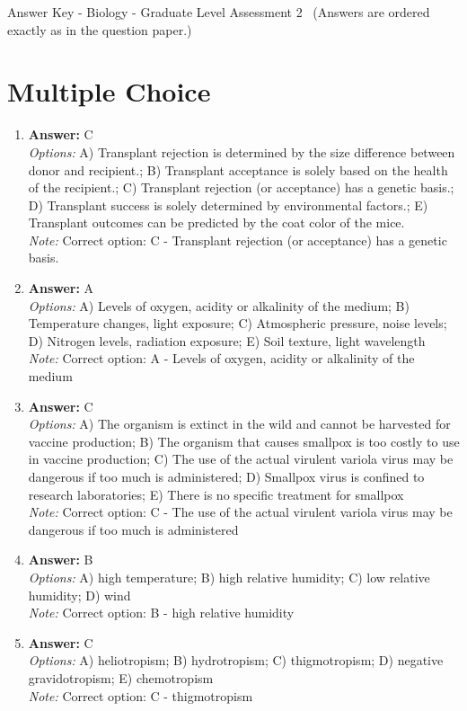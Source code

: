 \documentclass[12pt]{article}
\begin{document}
\begin{center}
Answer Key - Biology - Graduate Level Assessment 2 \
\small (Answers are ordered exactly as in the question paper.)
\end{center}

\section*{Multiple Choice}
\begin{enumerate}[label=\arabic*.]
\item \textbf{Answer:} C
\\ \textit{Options:} A) Transplant rejection is determined by the size difference between donor and recipient.; B) Transplant acceptance is solely based on the health of the recipient.; C) Transplant rejection (or acceptance) has a genetic basis.; D) Transplant success is solely determined by environmental factors.; E) Transplant outcomes can be predicted by the coat color of the mice.
\\ \textit{Note:} Correct option: C - Transplant rejection (or acceptance) has a genetic basis.
\item \textbf{Answer:} A
\\ \textit{Options:} A) Levels of oxygen, acidity or alkalinity of the medium; B) Temperature changes, light exposure; C) Atmospheric pressure, noise levels; D) Nitrogen levels, radiation exposure; E) Soil texture, light wavelength
\\ \textit{Note:} Correct option: A - Levels of oxygen, acidity or alkalinity of the medium
\item \textbf{Answer:} C
\\ \textit{Options:} A) The organism is extinct in the wild and cannot be harvested for vaccine production; B) The organism that causes smallpox is too costly to use in vaccine production; C) The use of the actual virulent variola virus may be dangerous if too much is administered; D) Smallpox virus is confined to research laboratories; E) There is no specific treatment for smallpox
\\ \textit{Note:} Correct option: C - The use of the actual virulent variola virus may be dangerous if too much is administered
\item \textbf{Answer:} B
\\ \textit{Options:} A) high temperature; B) high relative humidity; C) low relative humidity; D) wind
\\ \textit{Note:} Correct option: B - high relative humidity
\item \textbf{Answer:} C
\\ \textit{Options:} A) heliotropism; B) hydrotropism; C) thigmotropism; D) negative gravidotropism; E) chemotropism
\\ \textit{Note:} Correct option: C - thigmotropism
\end{enumerate}
\end{document}
